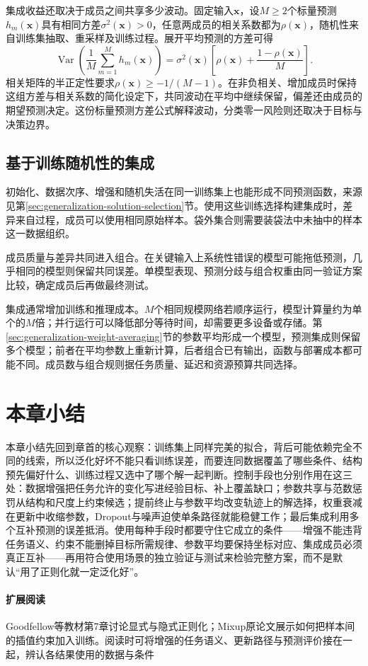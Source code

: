 集成收益还取决于成员之间共享多少波动。固定输入$\bm x$，设$M\geq2$个标量预测$h_m(\bm x)$具有相同方差$\sigma^2(\bm x)>0$，任意两成员的相关系数都为$\rho(\bm x)$，随机性来自训练集抽取、重采样及训练过程。展开平均预测的方差可得
\begin{equation}
 \operatorname{Var}\!\left(\frac1M\sum_{m=1}^M h_m(\bm x)\right)
 =\sigma^2(\bm x)\left[\rho(\bm x)+\frac{1-\rho(\bm x)}M\right].
 \label{eq:ensemble-correlated-variance}
\end{equation}
相关矩阵的半正定性要求$\rho(\bm x)\geq-1/(M-1)$。在非负相关、增加成员时保持这组方差与相关系数的简化设定下，共同波动在平均中继续保留，偏差还由成员的期望预测决定。这份标量预测方差公式解释波动，分类零一风险则还取决于目标与决策边界。

\subsection{基于训练随机性的集成}
\label{sec:generalization-randomness-ensemble}

初始化、数据次序、增强和随机失活在同一训练集上也能形成不同预测函数，来源见第\ref{sec:generalization-solution-selection}节。使用这些训练选择构建集成时，差异来自过程，成员可以使用相同原始样本。袋外集合则需要装袋法中未抽中的样本这一数据组织。

成员质量与差异共同进入组合。在关键输入上系统性错误的模型可能拖低预测，几乎相同的模型则保留共同误差。单模型表现、预测分歧与组合权重由同一验证方案比较，确定成员后再做最终测试。

集成通常增加训练和推理成本。$M$个相同规模网络若顺序运行，模型计算量约为单个的$M$倍；并行运行可以降低部分等待时间，却需要更多设备或存储。第\ref{sec:generalization-weight-averaging}节的参数平均形成一个模型，预测集成则保留多个模型；前者在平均参数上重新计算，后者组合已有输出，函数与部署成本都可能不同。成员数与组合规则据任务质量、延迟和资源预算共同选择。

\section{本章小结}
\label{sec:generalization-summary}

本章小结先回到章首的核心观察：训练集上同样完美的拟合，背后可能依赖完全不同的线索，所以泛化好坏不能只看训练误差，而要连同数据覆盖了哪些条件、结构预先偏好什么、训练过程又选中了哪个解一起判断。控制手段也分别作用在这三处：数据增强把任务允许的变化写进经验目标、补上覆盖缺口；参数共享与范数惩罚从结构和尺度上约束候选；提前终止与参数平均改变轨迹上的解选择，权重衰减在更新中收缩参数，Dropout与噪声迫使单条路径就能稳健工作；最后集成利用多个互补预测的误差抵消。使用每种手段时都要守住它成立的条件——增强不能违背任务语义、约束不能删掉目标所需规律、参数平均要保持坐标对应、集成成员必须真正互补——再用符合使用场景的独立验证与测试来检验完整方案，而不是默认“用了正则化就一定泛化好”。

\paragraph{扩展阅读}
Goodfellow等教材第7章讨论显式与隐式正则化；Mixup原论文展示如何把样本间的插值约束加入训练。阅读时可将增强的任务语义、更新路径与预测评价接在一起，辨认各结果使用的数据与条件
